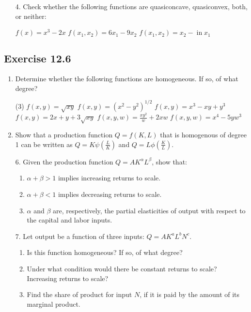 \documentclass{./../../Latex/homework}
\begin{document}
\begin{enumerate}
\item[4.] Check whether the following functions are quasiconcave, quasiconvex, both, or neither:
\begin{tasks}
\task $f(x)=x^{3}-2 x$
\task $f\left(x_{1}, x_{2}\right)=6 x_{1}-9 x_{2}$
\task $f\left(x_{1}, x_{2}\right)=x_{2}-\operatorname{in} x_{1}$
\end{tasks}

\end{enumerate}

\subsection*{Exercise 12.6}

\begin{enumerate}

\item Determine whether the following functions are homogeneous. If so, of what degree?
\begin{tasks}(3)
\task $f(x, y)=\sqrt{x y}$
\task $f(x, y)=\left(x^2-y^2\right)^{1 / 2}$
\task $f(x, y)=x^3-x y+y^3$
\task $f(x, y)=2 x+y+3 \sqrt{x y}$
\task $f(x, y, w)=\frac{x y^2}{w}+2 x w$
\task $f(x, y, w)=x^4-5 y w^3$
\end{tasks}

\item Show that a production function $Q=f(K, L)$ that is homogenous of degree 1 can be written as $Q=K\psi\left(\frac{L}{K}\right)$ and $Q=L \phi\left(\frac{K}{L}\right)$.

\item[6.] Given the production function $Q=A K^{\alpha} L^{\beta}$, show that:
\begin{enumerate}
\item $\alpha+\beta>1$ implies increasing returns to scale.
\item $\alpha+\beta<1$ implies decreasing returns to scale.
\item $\alpha$ and $\beta$ are, respectively, the partial elasticities of output with respect to the capital and labor inputs.
\end{enumerate}

\item[7.] Let output be a function of three inputs: $Q=A K^a L^b N^c$.
\begin{enumerate}
\item Is this function homogeneous? If so, of what degree?
\item Under what condition would there be constant returns to scale? Increasing returns to scale?
\item Find the share of product for input $N$, if it is paid by the amount of its marginal product.
\end{enumerate}

\end{enumerate}
\end{document}
